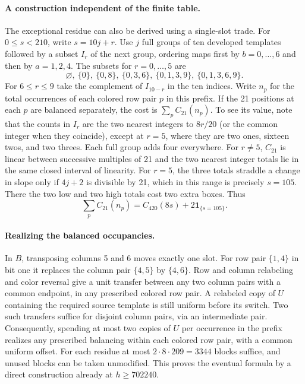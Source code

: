 \documentclass[11pt]{article}
\newcommand{\one}{\mathbf 1}
\begin{document}
\paragraph{A construction independent of the finite table.}
The exceptional residue can also be derived using a single-slot trade. For $0\le s<210$, write $s=10j+r$. Use $j$ full groups of ten developed templates followed by a subset $I_r$ of the next group, ordering maps first by $b=0,\ldots,6$ and then by $a=1,2,4$. The subsets for $r=0,\ldots,5$ are
\[
 \varnothing,\ \{0\},\ \{0,8\},\ \{0,3,6\},\ \{0,1,3,9\},\ \{0,1,3,6,9\}.
\]
For $6\le r\le9$ take the complement of $I_{10-r}$ in the ten indices. Write $n_p$ for the total occurrences of each colored row pair $p$ in this prefix. If the 21 positions at each $p$ are balanced separately, the cost is $\sum_p C_{21}(n_p)$. To see its value, note that the counts in $I_r$ are the two nearest integers to $8r/20$ (or the common integer when they coincide), except at $r=5$, where they are two ones, sixteen twos, and two threes. Each full group adds four everywhere. For $r\ne5$, $C_{21}$ is linear between successive multiples of 21 and the two nearest integer totals lie in the same closed interval of linearity. For $r=5$, the three totals straddle a change in slope only if $4j+2$ is divisible by 21, which in this range is precisely $s=105$. There the two low and two high totals cost two extra boxes. Thus
\[
 \sum_p C_{21}(n_p)= C_{420}(8s)+2\one_{\{s=105\}}.       \tag{1}
\]

\paragraph{Realizing the balanced occupancies.}
In $B$, transposing columns 5 and 6 moves exactly one slot. For row pair $\{1,4\}$ in bit one it replaces the column pair $\{4,5\}$ by $\{4,6\}$. Row and column relabeling and color reversal give a unit transfer between any two column pairs with a common endpoint, in any prescribed colored row pair. A relabeled copy of $U$ containing the required source template is still uniform before its switch. Two such transfers suffice for disjoint column pairs, via an intermediate pair. Consequently, spending at most two copies of $U$ per occurrence in the prefix realizes any prescribed balancing within each colored row pair, with a common uniform offset. For each residue at most $2\cdot8\cdot209=3344$ blocks suffice, and unused blocks can be taken unmodified. This proves the eventual formula by a direct construction already at $h\ge702240$.
\end{document}
